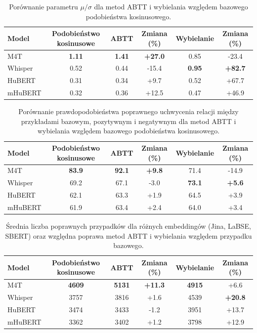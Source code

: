 \begin{table}[h]
\centering
\begin{tabular}{lccccc}
\toprule
Model &
\multicolumn{1}{c}{Podobieństwo kosinusowe} &
\multicolumn{1}{c}{ABTT} &
\multicolumn{1}{c}{Zmiana (\%)} &
\multicolumn{1}{c}{Wybielanie} &
\multicolumn{1}{c}{Zmiana (\%)} \\
\midrule
M4T     & \textbf{1.11} & \textbf{1.41} & \textbf{+27.0} & 0.85 & -23.4 \\
Whisper & 0.52 & 0.44 & -15.4 & \textbf{0.95} & \textbf{+82.7} \\
HuBERT  & 0.31 & 0.34 & +9.7  & 0.52 & +67.7 \\
mHuBERT & 0.32 & 0.36 & +12.5 & 0.47 & +46.9 \\
\bottomrule
\end{tabular}
\caption{Porównanie parametru $\mu/\sigma$ dla metod ABTT i wybielania względem bazowego podobieństwa kosinusowego.}
\label{tab:latent:compLoc}
\end{table}

\begin{table}[h]
\centering
\begin{tabular}{lccccc}
\toprule
Model &
\multicolumn{1}{c}{Podobieństwo kosinusowe} &
\multicolumn{1}{c}{ABTT} &
\multicolumn{1}{c}{Zmiana (\%)} &
\multicolumn{1}{c}{Wybielanie} &
\multicolumn{1}{c}{Zmiana (\%)} \\
\midrule
M4T     & \textbf{83.9} & \textbf{92.1} & \textbf{+9.8} & 71.4 & -14.9 \\
Whisper & 69.2 & 67.1 & -3.0 & \textbf{73.1} & \textbf{+5.6} \\
HuBERT  & 62.1 & 63.3 & +1.9 & 64.5 & +3.9 \\
mHuBERT & 61.9 & 63.4 & +2.4 & 64.0 & +3.4 \\
\bottomrule
\end{tabular}
\caption{Porównanie prawdopodobieństwa poprawnego uchwycenia relacji między przykładami bazowym, pozytywnym i negatywnym dla metod ABTT i wybielania względem bazowego podobieństwa kosinusowego.}
\label{tab:latent:compProb}
\end{table}

\begin{table}[h]
\centering
\begin{tabular}{lccccc}
\toprule
Model &
Podobieństwo kosinusowe &
ABTT  &
Zmiana (\%) &
Wybielanie &
Zmiana (\%) \\
\midrule
M4T
& \textbf{4609} & \textbf{5131} & \textbf{+11.3} & \textbf{4915} & +6.6 \\
Whisper
& 3757 & 3816 & +1.6  & 4539 & \textbf{+20.8} \\
HuBERT
& 3474 & 3433 & -1.2  & 3951 & +13.7 \\
mHuBERT
& 3362 & 3402 & +1.2  & 3798 & +12.9 \\
\bottomrule
\end{tabular}
\caption{Średnia liczba poprawnych przypadków dla różnych embeddingów (Jina, LaBSE, SBERT) oraz względna poprawa metod ABTT i wybielania względem przypadku bazowego.}
\label{tab:latent:processingCounts}
\end{table}


